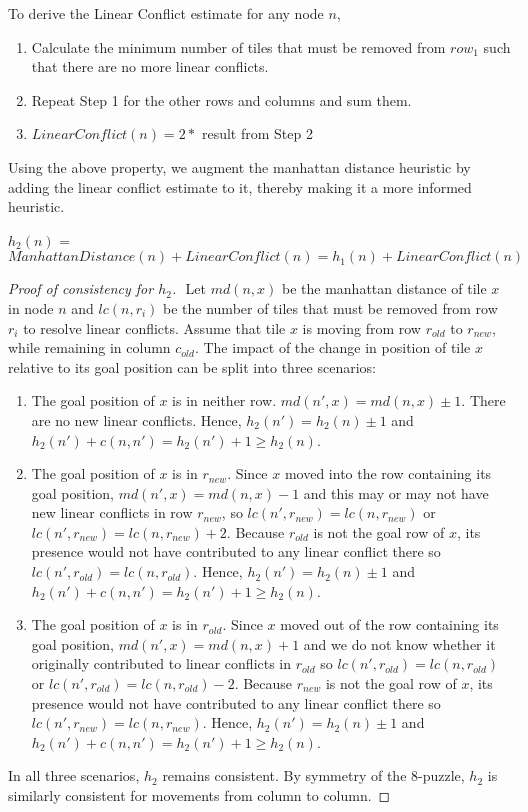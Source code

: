 \documentclass[11pt, a4paper]{article}
\begin{document}
To derive the Linear Conflict estimate for any node $n$,
\begin{enumerate}
  \item Calculate the minimum number of tiles that must be removed from $row_1$ such that there are no more linear conflicts.
  \item Repeat Step 1 for the other rows and columns and sum them.
  \item $LinearConflict(n) = 2 * $ result from Step 2
\end{enumerate}

Using the above property, we augment the manhattan distance heuristic by adding the linear conflict estimate to it, thereby making it a more informed heuristic.

\begin{center}
  $h_2(n)$ = $ManhattanDistance(n) + LinearConflict(n) = h_1(n) + LinearConflict(n)$
\end{center}

\begin{proof}[Proof of consistency for $h_2$]
  $ $\newline
  Let $md(n, x)$ be the manhattan distance of tile $x$ in node $n$ and $lc(n, r_i)$ be the number of tiles that must be removed from row $r_i$ to resolve linear conflicts.
  Assume that tile $x$ is moving from row $r_{old}$ to $r_{new}$, while remaining in column $c_{old}$. The impact of the change in position of tile $x$ relative to its goal position can be split into three scenarios:
  \begin{enumerate}
    \item The goal position of $x$ is in neither row. $md(n', x) = md(n, x) \pm 1$. There are no new linear conflicts. Hence, $h_2(n') = h_2(n) \pm 1$ and $h_2(n') + c(n, n') = h_2(n') + 1 \geq h_2(n)$.
    \item The goal position of $x$ is in $r_{new}$. Since $x$ moved into the row containing its goal position, $md(n', x) = md(n, x) - 1$ and this may or may not have new linear conflicts in row $r_{new}$, so $lc(n', r_{new}) = lc(n, r_{new})$ or $lc(n', r_{new}) = lc(n, r_{new}) + 2$. Because $r_{old}$ is not the goal row of $x$, its presence would not have contributed to any linear conflict there so $lc(n', r_{old}) = lc(n, r_{old})$. Hence, $h_2(n') = h_2(n) \pm 1$ and $h_2(n') + c(n, n') = h_2(n') + 1 \geq h_2(n)$.
    \item The goal position of $x$ is in $r_{old}$. Since $x$ moved out of the row containing its goal position, $md(n', x) = md(n, x) + 1$ and we do not know whether it originally contributed to linear conflicts in $r_{old}$ so $lc(n', r_{old}) = lc(n, r_{old})$ or $lc(n', r_{old}) = lc(n, r_{old}) - 2$. Because $r_{new}$ is not the goal row of $x$, its presence would not have contributed to any linear conflict there so $lc(n', r_{new}) = lc(n, r_{new})$. Hence, $h_2(n') = h_2(n) \pm 1$ and $h_2(n') + c(n, n') = h_2(n') + 1 \geq h_2(n)$.
  \end{enumerate}
  In all three scenarios, $h_2$ remains consistent. By symmetry of the 8-puzzle, $h_2$ is similarly consistent for movements from column to column.
\end{proof}
\end{document}

